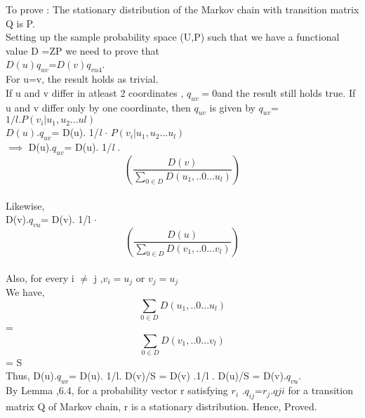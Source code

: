 To prove : The stationary distribution of the Markov chain with transition matrix Q is P.\\
Setting up the sample probability space (U,P) such that we have a functional value D =ZP we need to prove that\\
$D(u)q_{uv}$=$D(v)q_{vu4}$. \\
For u=v, the result holds as trivial. \\
If u and v differ in atleast 2 coordinates , $q_{uv}=0 $and the result still holds true.
If u and v differ only by one coordinate, then $q_{uv}$ is given by  $q_{uv}$=  $  1/l . P(v_{i} | u_{1}, u_{2}... u{l})$ \\
$D(u).q_{uv}$= D(u). 1/\emph{l} $\cdot$ $P(v_{i} | u_{1}, u_{2}... u_{l} )$ \\ 
$\implies $  D(u).$q_{uv}$= D(u). 1/\emph{l} . $$(\frac{D(v)}{ \sum_{0 \in D} D(u_{1}, ..0...u_{l})})$$  \\
Likewise, \\
D(v).$q_{vu}$= D(v). 1/l $\cdot$ $$(\frac{D(u)}{\sum_{0 \in D} D(v_{1}, ..0...v_{l})})$$  \\
Also, for every i $\neq$ j ,$ v_{i}= u_{j}$ or $ v_{j}=u_{j}$ \\
We have,\\
$$\sum_{0 \in D} D(u_{1}, ..0...u_{l})$$ =  $$\sum_{0 \in D} D(v_{1}, ..0...v_{l})$$ = S  \\

Thus, D(u).$q_{uv}$= D(u). 1/l. D(v)/S = D(v) .1/l . D(u)/S = D(v).$q_{vu}$.\\
By Lemma ,6.4, for a probability vector r satisfying $r_{i}$ .$q_{ij}$=$r_{j}.q{ji}$ for a transition matrix Q of Markov chain, r is a stationary distribution. Hence, Proved.

